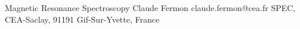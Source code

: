 \begin{conf-abstract}[]
{Magnetic Resonance Spectroscopy}
{\color{blue} Claude Fermon}
{claude.fermon@cea.fr}
{SPEC, CEA-Saclay, 91191 Gif-Sur-Yvette, France}
{\decofourleft \decofourright}





\printbibliography[heading=none]

\end{conf-abstract}
